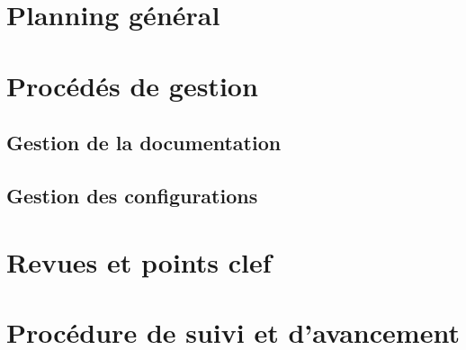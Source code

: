 \documentclass{../../res/univ-projet}
\begin{document}
\section{Planning général}


\section{Procédés de gestion}
\subsection{Gestion de la documentation}

\subsection{Gestion des configurations}

\section{Revues et points clef}

\section{Procédure de suivi et d'avancement}
\end{document}
